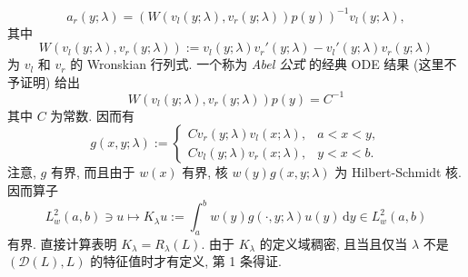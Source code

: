 \begin{Proof}
\begin{equation}\label{eq:sturm-liouville-green-right-coefficient}
a_r(y;\lambda)=(W(v_l(y;\lambda),v_r(y;\lambda))p(y))^{-1}v_l(y;\lambda),
\end{equation}
其中
\begin{equation}\label{eq:sturm-liouville-fundamental-wronskian}
W(v_l(y;\lambda),v_r(y;\lambda)):=v_l(y;\lambda)v_r'(y;\lambda)-v_l'(y;\lambda)v_r(y;\lambda)
\end{equation}
为 $v_l$ 和 $v_r$ 的 Wronskian 行列式. 一个称为 \emph{Abel 公式} 的经典 ODE 结果 (这里不予证明) 给出
\begin{equation}\label{eq:sturm-liouville-abel-constant-wronskian}
W(v_l(y;\lambda),v_r(y;\lambda))p(y)=C^{-1}
\end{equation}
其中 $C$ 为常数. 因而有
\begin{equation}\label{eq:sturm-liouville-green-function-explicit-kernel}
g(x,y;\lambda):=\begin{cases}
Cv_r(y;\lambda)v_l(x;\lambda),&a<x<y,\\
Cv_l(y;\lambda)v_r(x;\lambda),&y<x<b.
\end{cases}
\end{equation}
注意, $g$ 有界, 而且由于 $w(x)$ 有界, 核 $w(y)g(x,y;\lambda)$ 为 Hilbert-Schmidt 核. 因而算子
\begin{equation}\label{eq:sturm-liouville-weighted-green-resolvent-operator}
L_w^2(a,b)\ni u\mapsto K_\lambda u:=\int_a^bw(y)g(\cdot,y;\lambda)u(y)\,\mathrm{d}y\in L_w^2(a,b)
\end{equation}
有界. 直接计算表明 $K_\lambda=R_\lambda(L)$. 由于 $K_\lambda$ 的定义域稠密, 且当且仅当 $\lambda$ 不是 $(\mathcal{D}(L),L)$ 的特征值时才有定义, 第 1 条得证.


\end{Proof}
